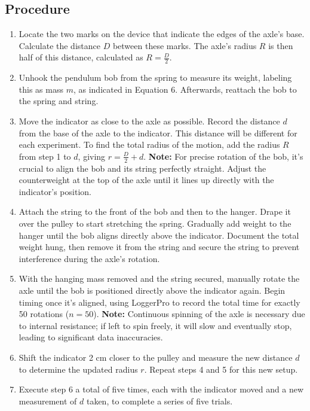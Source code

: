 \documentclass{report}
\begin{document}
    \subsection{Procedure}
    \begin{enumerate}
        \item Locate the two marks on the device that indicate the edges of the axle's base. Calculate the distance $D$ between these marks. The axle's radius $R$ is then half of this distance, calculated as $R = \frac{D}{2}$.
        \item Unhook the pendulum bob from the spring to measure its weight, labeling this as mass $m$, as indicated in Equation 6. Afterwards, reattach the bob to the spring and string.
        \item Move the indicator as close to the axle as possible. Record the distance $d$ from the base of the axle to the indicator. This distance will be different for each experiment. To find the total radius of the motion, add the radius $R$ from step 1 to $d$, giving $r = \frac{D}{2} + d$.
            \textbf{Note:} For precise rotation of the bob, it's crucial to align the bob and its string perfectly straight. Adjust the counterweight at the top of the axle until it lines up directly with the indicator's position.
        \item Attach the string to the front of the bob and then to the hanger. Drape it over the pulley to start stretching the spring. Gradually add weight to the hanger until the bob aligns directly above the indicator. Document the total weight hung, then remove it from the string and secure the string to prevent interference during the axle's rotation.
        \item With the hanging mass removed and the string secured, manually rotate the axle until the bob is positioned directly above the indicator again. Begin timing once it's aligned, using LoggerPro to record the total time for exactly 50 rotations ($n = 50$).
            \textbf{Note:} Continuous spinning of the axle is necessary due to internal resistance; if left to spin freely, it will slow and eventually stop, leading to significant data inaccuracies.
        \item Shift the indicator 2 cm closer to the pulley and measure the new distance $d$ to determine the updated radius $r$. Repeat steps 4 and 5 for this new setup.
        \item Execute step 6 a total of five times, each with the indicator moved and a new measurement of $d$ taken, to complete a series of five trials.
    \end{enumerate}
\end{document}
